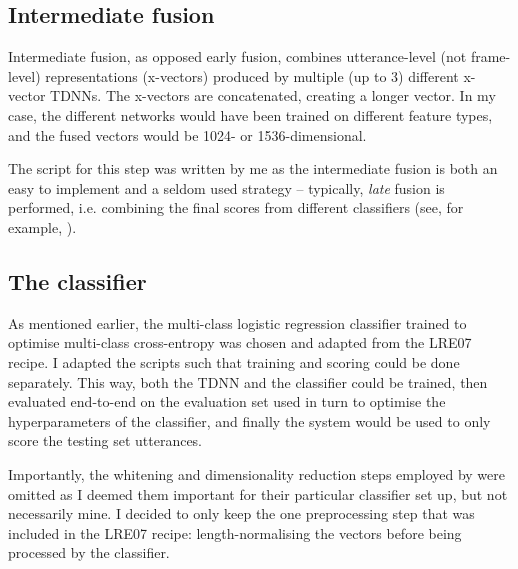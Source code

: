 \documentclass[bsc,frontabs,twoside,singlespacing,parskip,deptreport]{infthesis}
\begin{document}
{{    \subsection{Intermediate fusion}{
      \label{sec:intermediate-fusion}
      Intermediate fusion, as opposed early fusion, combines utterance-level (not frame-level) representations (x-vectors) produced by multiple (up to 3) different x-vector TDNNs. The x-vectors are concatenated, creating a longer vector. In my case, the different networks would have been trained on different feature types, and the fused vectors would be 1024- or 1536-dimensional.

      The script for this step was written by me as the intermediate fusion is both an easy to implement and a seldom used strategy -- typically, \textit{late} fusion is performed, i.e. combining the final scores from different classifiers (see, for example, \citet{Snyder_et_al_2018,Martinez_et_al_2012}).
    }

    \subsection{The classifier}{
      \label{sec:classifier-description}

      As mentioned earlier, the multi-class logistic regression classifier trained to optimise multi-class cross-entropy was chosen and adapted from the LRE07 recipe. I adapted the scripts such that training and scoring could be done separately. This way, both the TDNN and the classifier could be trained, then evaluated end-to-end on the evaluation set used in turn to optimise the hyperparameters of the classifier, and finally the system would be used to only score the testing set utterances.

      Importantly, the whitening and dimensionality reduction steps employed by \citet{Snyder_et_al_2018} were omitted as I deemed them important for their particular classifier set up, but not necessarily mine. I decided to only keep the one preprocessing step that was included in the LRE07 recipe: length-normalising the vectors before being processed by the classifier.

}}}
\end{document}
